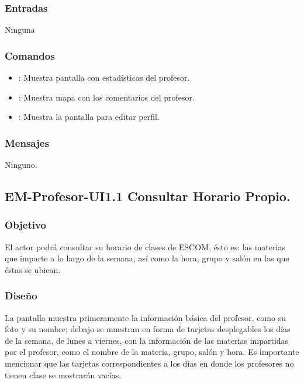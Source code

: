 \subsubsection{Entradas}
	\noindent
	Ninguna

\subsubsection{Comandos}
	\begin{itemize}
		\item {}: Muestra pantalla con estadísticas del profesor.
		\item {}: Muestra mapa con los comentarios del profesor.
		\item {}: Muestra la pantalla para editar perfil.
	\end{itemize}

\subsubsection{Mensajes}
	\noindent
	Ninguno.


\subsection{EM-Profesor-UI1.1 Consultar Horario Propio.}

\subsubsection{Objetivo}
	\noindent
	El actor podrá consultar su horario de clases de ESCOM, ésto es: las materias que imparte a lo largo de la semana, así como la hora, grupo y salón en las que éstas se ubican.


\subsubsection{Diseño}
	\noindent
	La pantalla muestra primeramente la información básica del profesor, como su foto y su nombre; debajo se muestran en forma de tarjetas desplegables los días de la semana, de lunes a viernes, con la información de las materias impartidas por el profesor, como el nombre de la materia, grupo, salón y hora. Es importante mencionar que las tarjetas correspondientes a los días en donde los profesores no tienen clase se mostrarán vacías.

